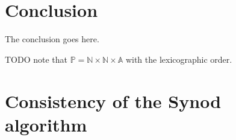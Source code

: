 \documentclass[journal]{IEEEtran}
\begin{document}




\section{Conclusion}
The conclusion goes here.

TODO note that $\mathbb P = \mathbb N \times \mathbb N \times \mathbb A$
with the lexicographic order.





%


\appendices
\section{Consistency of the Synod algorithm}
\label{synod-safety}
\end{document}
